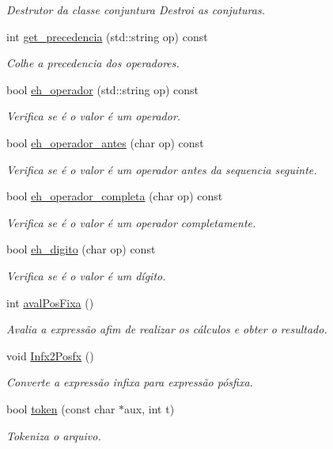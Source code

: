 \begin{DoxyCompactItemize}
\begin{DoxyCompactList}\small\item\em Destrutor da classe conjuntura Destroi as conjuturas. \end{DoxyCompactList}\item 
int \hyperlink{classconjuntura_acdea319e644d7e5c12d7b9c5fe891a28}{get\+\_\+precedencia} (std\+::string op) const 
\begin{DoxyCompactList}\small\item\em Colhe a precedencia dos operadores. \end{DoxyCompactList}\item 
bool \hyperlink{classconjuntura_ad431182bd209959cbc242855e17c24a6}{eh\+\_\+operador} (std\+::string op) const 
\begin{DoxyCompactList}\small\item\em Verifica se é o valor é um operador. \end{DoxyCompactList}\item 
bool \hyperlink{classconjuntura_a203d067e8788a4be7b879c2bf619e400}{eh\+\_\+operador\+\_\+antes} (char op) const 
\begin{DoxyCompactList}\small\item\em Verifica se é o valor é um operador antes da sequencia seguinte. \end{DoxyCompactList}\item 
bool \hyperlink{classconjuntura_ae6596c44980af69b76028e9e07bdbc27}{eh\+\_\+operador\+\_\+completa} (char op) const 
\begin{DoxyCompactList}\small\item\em Verifica se é o valor é um operador completamente. \end{DoxyCompactList}\item 
bool \hyperlink{classconjuntura_aa965f1bcbff1d132fd9b333a032c6e69}{eh\+\_\+digito} (char op) const 
\begin{DoxyCompactList}\small\item\em Verifica se é o valor é um dígito. \end{DoxyCompactList}\item 
int \hyperlink{classconjuntura_a8cf783aa2603fd8b5b28a813e320fb81}{aval\+Pos\+Fixa} ()
\begin{DoxyCompactList}\small\item\em Avalia a expressão afim de realizar os cálculos e obter o resultado. \end{DoxyCompactList}\item 
void \hyperlink{classconjuntura_a5ed989aef05d806b69852592832e2b64}{Infx2\+Posfx} ()
\begin{DoxyCompactList}\small\item\em Converte a expressão infixa para expressão pósfixa. \end{DoxyCompactList}\item 
bool \hyperlink{classconjuntura_a264666a5fb0a1810eeaa6d1ea59283a5}{token} (const char $\ast$aux, int t)
\begin{DoxyCompactList}\small\item\em Tokeniza o arquivo. \end{DoxyCompactList}\end{DoxyCompactItemize}


